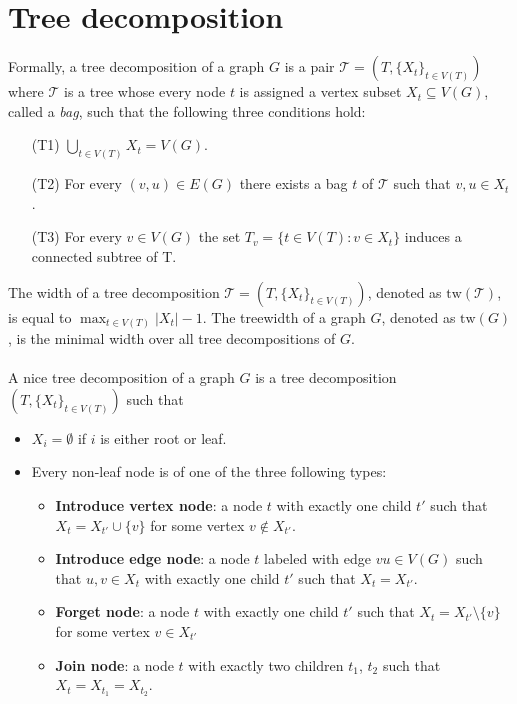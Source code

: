 \documentclass[en]{pracamgr}
\theoremstyle{definition}
\begin{document}
\section{Tree decomposition}

Formally, a tree decomposition of a graph $G$ is a pair $\mathcal{T} = (T, \{X_t\}_{t\in V(T)})$ where $\mathcal{T}$ is a tree whose every node $t$ is assigned a vertex subset $X_t \subseteq V(G)$, called a \emph{bag}, such that the following three conditions hold:
\begin{itemize}
	\item[(T1)] $\bigcup_{t\in V(T)}X_t = V(G)$.
	\item[(T2)] For every $(v,u) \in E(G)$ there exists a bag $t$ of $\mathcal{T}$ such that $v,u \in X_t$.
	\item[(T3)] For every $v \in V(G)$ the set $T_v = \{t \in V(T): v \in X_t\}$ induces a connected subtree of T.
\end{itemize}

The width of a tree decomposition $\mathcal{T} = (T,\{X_t\}_{t\in V(T)})$, denoted as $\textrm{tw}(\mathcal{T})$, is equal to $\max_{t \in V(T)} |X_t| - 1$. The treewidth of a graph $G$, denoted as $\textrm{tw}(G)$, is the minimal width over all tree decompositions of $G$.
\\\\
A nice tree decomposition of a graph $G$ is a tree decomposition $(T, \{X_t\}_{t \in V(T)})$ such that
\begin{itemize}
	\item $X_i = \emptyset$ if $i$ is either root or leaf.
	\item Every non-leaf node is of one of the three following types:
	\begin{itemize}
		\item \textbf{Introduce vertex node}: a node $t$ with exactly one child $t'$ such that $X_t = X_{t'} \cup \{v\}$ for some vertex $v \notin X_{t'}$.
		\item \textbf{Introduce edge node}: a node $t$ labeled with edge $vu \in V(G)$ such that $u,v \in X_t$ with exactly one child $t'$ such that $X_t = X_{t'}$.
		\item \textbf{Forget node}: a node $t$ with exactly one child $t'$ such that $X_t = X_{t'} \setminus \{v\}$ for some vertex $v \in X_{t'}$
		\item \textbf{Join node}: a node $t$ with exactly two children $t_1$, $t_2$ such that $X_t = X_{t_1} = X_{t_2}$.
	\end{itemize}
\end{itemize}
\end{document}
